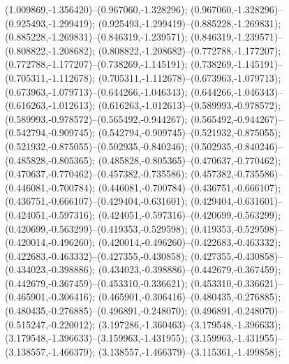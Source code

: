  (1.009869,-1.356420)--(0.967060,-1.328296);
 (0.967060,-1.328296)--(0.925493,-1.299419);
 (0.925493,-1.299419)--(0.885228,-1.269831);
 (0.885228,-1.269831)--(0.846319,-1.239571);
 (0.846319,-1.239571)--(0.808822,-1.208682);
 (0.808822,-1.208682)--(0.772788,-1.177207);
 (0.772788,-1.177207)--(0.738269,-1.145191);
 (0.738269,-1.145191)--(0.705311,-1.112678);
 (0.705311,-1.112678)--(0.673963,-1.079713);
 (0.673963,-1.079713)--(0.644266,-1.046343);
 (0.644266,-1.046343)--(0.616263,-1.012613);
 (0.616263,-1.012613)--(0.589993,-0.978572);
 (0.589993,-0.978572)--(0.565492,-0.944267);
 (0.565492,-0.944267)--(0.542794,-0.909745);
 (0.542794,-0.909745)--(0.521932,-0.875055);
 (0.521932,-0.875055)--(0.502935,-0.840246);
 (0.502935,-0.840246)--(0.485828,-0.805365);
 (0.485828,-0.805365)--(0.470637,-0.770462);
 (0.470637,-0.770462)--(0.457382,-0.735586);
 (0.457382,-0.735586)--(0.446081,-0.700784);
 (0.446081,-0.700784)--(0.436751,-0.666107);
 (0.436751,-0.666107)--(0.429404,-0.631601);
 (0.429404,-0.631601)--(0.424051,-0.597316);
 (0.424051,-0.597316)--(0.420699,-0.563299);
 (0.420699,-0.563299)--(0.419353,-0.529598);
 (0.419353,-0.529598)--(0.420014,-0.496260);
 (0.420014,-0.496260)--(0.422683,-0.463332);
 (0.422683,-0.463332)--(0.427355,-0.430858);
 (0.427355,-0.430858)--(0.434023,-0.398886);
 (0.434023,-0.398886)--(0.442679,-0.367459);
 (0.442679,-0.367459)--(0.453310,-0.336621);
 (0.453310,-0.336621)--(0.465901,-0.306416);
 (0.465901,-0.306416)--(0.480435,-0.276885);
 (0.480435,-0.276885)--(0.496891,-0.248070);
 (0.496891,-0.248070)--(0.515247,-0.220012);
 (3.197286,-1.360463)--(3.179548,-1.396633);
 (3.179548,-1.396633)--(3.159963,-1.431955);
 (3.159963,-1.431955)--(3.138557,-1.466379);
 (3.138557,-1.466379)--(3.115361,-1.499858);
